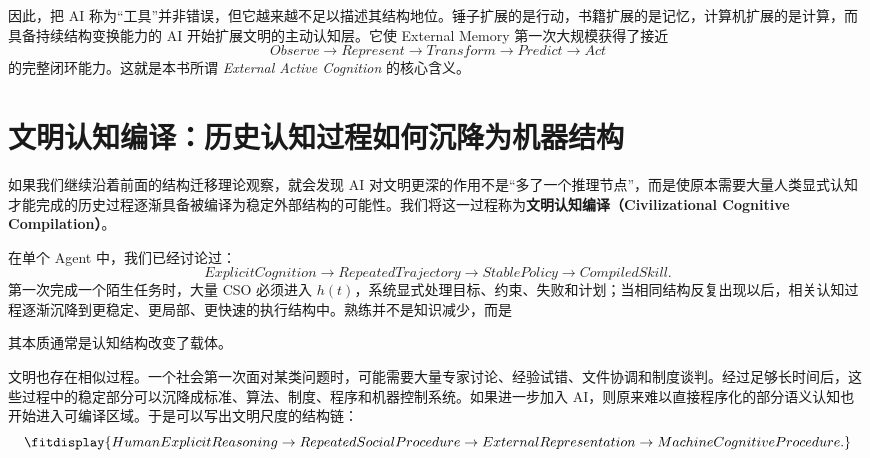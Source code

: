因此，把 AI 称为“工具”并非错误，但它越来越不足以描述其结构地位。锤子扩展的是行动，书籍扩展的是记忆，计算机扩展的是计算，而具备持续结构变换能力的 AI 开始扩展文明的主动认知层。它使 External Memory 第一次大规模获得了接近
\begin{equation}
Observe
\rightarrow
Represent
\rightarrow
Transform
\rightarrow
Predict
\rightarrow
Act
\end{equation}
的完整闭环能力。这就是本书所谓 \textit{External Active Cognition} 的核心含义。

\section{文明认知编译：历史认知过程如何沉降为机器结构}

如果我们继续沿着前面的结构迁移理论观察，就会发现 AI 对文明更深的作用不是“多了一个推理节点”，而是使原本需要大量人类显式认知才能完成的历史过程逐渐具备被编译为稳定外部结构的可能性。我们将这一过程称为\textbf{文明认知编译（Civilizational Cognitive Compilation）}。

在单个 Agent 中，我们已经讨论过：
\begin{equation}
ExplicitCognition
\rightarrow
RepeatedTrajectory
\rightarrow
StablePolicy
\rightarrow
CompiledSkill.
\end{equation}
第一次完成一个陌生任务时，大量 CSO 必须进入 $h(t)$，系统显式处理目标、约束、失败和计划；当相同结构反复出现以后，相关认知过程逐渐沉降到更稳定、更局部、更快速的执行结构中。熟练并不是知识减少，而是
\begin{statementbox}
\centering
{}
\end{statementbox}
其本质通常是认知结构改变了载体。

文明也存在相似过程。一个社会第一次面对某类问题时，可能需要大量专家讨论、经验试错、文件协调和制度谈判。经过足够长时间后，这些过程中的稳定部分可以沉降成标准、算法、制度、程序和机器控制系统。如果进一步加入 AI，则原来难以直接程序化的部分语义认知也开始进入可编译区域。于是可以写出文明尺度的结构链：
\begin{equation}
\fitdisplay{
HumanExplicitReasoning
\rightarrow
RepeatedSocialProcedure
\rightarrow
ExternalRepresentation
\rightarrow
MachineCognitiveProcedure.
}
\end{equation}

